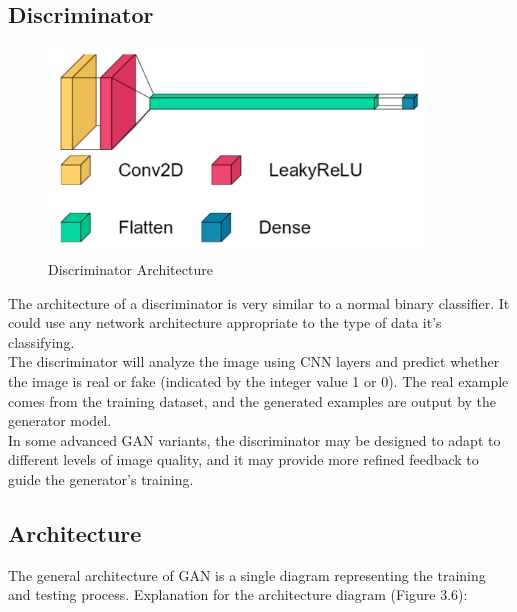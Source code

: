 \clearpage

\subsection{Discriminator}

\begin{figure}[h!]
    \centering
    \includegraphics[width=0.9\textwidth]{Images/dis_arch.png}
    \caption{Discriminator Architecture}
\end{figure}

\noindent
The architecture of a discriminator is very similar to a normal binary classifier. It could use any network architecture appropriate to the type of data it's classifying. \\

\noindent
The discriminator will analyze the image using CNN layers and predict whether the image is real or fake (indicated by the integer value 1 or 0). The real example comes from the training dataset, and the generated examples are output by the generator model.\\

\noindent
In some advanced GAN variants, the discriminator may be designed to adapt to different levels of image quality, and it may provide more refined feedback to guide the generator's training.

\clearpage


\subsection{Architecture}

\noindent
The general architecture of GAN is a single diagram representing the training and testing process. Explanation for the architecture diagram (Figure 3.6):\\

